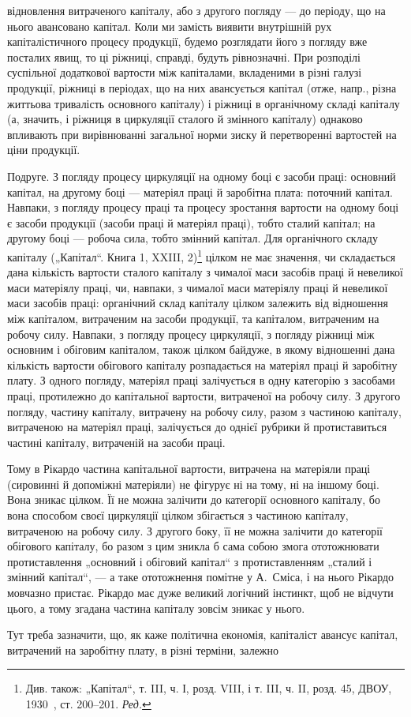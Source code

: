 \parcont{}  %
відновлення витраченого капіталу, або з другого погляду — до періоду,
що на нього авансовано капітал. Коли ми замість виявити внутрішній
рух капіталістичного процесу продукції, будемо розглядати його з погляду
вже посталих явищ, то ці ріжниці, справді, будуть рівнозначні. При
розподілі суспільної додаткової вартости між капіталами, вкладеними
в різні галузі продукції, ріжниці в періодах, що на них авансується
капітал (отже, напр., різна життьова тривалість основного капіталу) і
ріжниці в органічному складі капіталу (а, значить, і ріжниця в циркуляції
сталого й змінного капіталу) однаково впливають при вирівнюванні загальної
норми зиску й перетворенні вартостей на ціни продукції.

Подруге. З погляду процесу циркуляції на одному боці є засоби
праці: основний капітал, на другому боці — матеріял праці й заробітна
плата: поточний капітал. Навпаки, з погляду процесу праці та процесу
зростання вартости на одному боці є засоби продукції (засоби праці й
матеріял праці), тобто сталий капітал; на другому боці — робоча сила, тобто
змінний капітал. Для органічного складу капіталу („Капітал“. Книга 1,
XXIII, 2)\footnote*{
Див. також: „Капітал“, т. III, ч. І, розд. VIII, і т. III, ч. II, розд. 45, ДВОУ,
1930~, ст. 200--201. \emph{Ред.}
} цілком не має значення, чи складається дана кількість вартости
сталого капіталу з чималої маси засобів праці й невеликої маси
матеріялу праці, чи, навпаки, з чималої маси матеріялу праці й невеликої
маси засобів праці: органічний склад капіталу цілком залежить від відношення
між капіталом, витраченим на засоби продукції, та капіталом, витраченим
на робочу силу. Навпаки, з погляду процесу циркуляції, з погляду
ріжниці між основним і обіговим капіталом, також цілком байдуже,
в якому відношенні дана кількість вартости обігового капіталу розпадається
на матеріял праці й заробітну плату. З одного погляду, матеріял
праці залічується в одну категорію з засобами праці, протилежно до
капітальної вартости, витраченої на робочу силу. З другого погляду,
частину капіталу, витрачену на робочу силу, разом з частиною капіталу,
витраченою на матеріял праці, залічується до однієї рубрики й протиставиться
частині капіталу, витраченій на засоби праці.

Тому в Рікардо частина капітальної вартости, витрачена на матеріяли
праці (сировинні й допоміжні матеріяли) не фігурує ні на тому, ні на іншому
боці. Вона зникає цілком. Її не можна залічити до категорії основного
капіталу, бо вона способом своєї циркуляції цілком збігається
з частиною капіталу, витраченою на робочу силу. З другого боку, її не
можна залічити до категорії обігового капіталу, бо разом з цим зникла
б сама собою змога ототожнювати протиставлення „основний і обіговий
капітал“ з протиставленням „сталий і змінний капітал“, — а таке ототожнення
помітне у А.~Сміса, і на нього Рікардо мовчазно пристає. Рікардо
має дуже великий логічний інстинкт, щоб не відчути цього, а тому згадана
частина капіталу зовсім зникає у нього.

Тут треба зазначити, що, як каже політична економія, капіталіст
авансує капітал, витрачений на заробітну плату, в різні терміни, залежно
\parbreak{}  %
